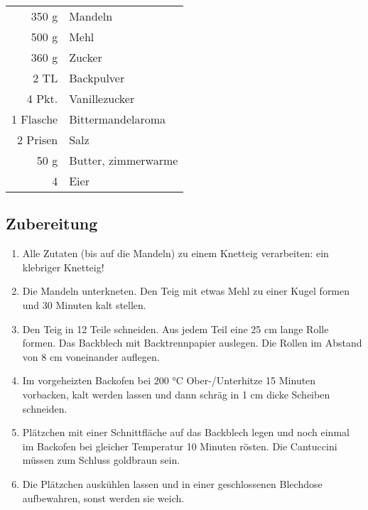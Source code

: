 \begin {tabular}{r l}
    350 g & Mandeln \\
    500 g & Mehl \\
    360 g & Zucker \\
    2 TL & Backpulver \\
    4 Pkt. & Vanillezucker \\
    1 Flasche & Bittermandelaroma \\
    2 Prisen & Salz \\
    50 g & Butter, zimmerwarme \\
    4 & Eier
\end{tabular}
\subsection*{Zubereitung}
\begin{enumerate}
    \item  Alle Zutaten (bis auf die Mandeln) zu einem Knetteig verarbeiten: ein klebriger Knetteig!
    \item  Die Mandeln unterkneten. Den Teig mit etwas Mehl zu einer Kugel formen und 30 Minuten kalt stellen.
    \item  Den Teig in 12 Teile schneiden. Aus jedem Teil eine 25 cm lange Rolle formen. Das Backblech mit Backtrennpapier auslegen. Die Rollen im
    Abstand von 8 cm voneinander auflegen.
    \item  Im vorgeheizten Backofen bei 200 °C Ober-/Unterhitze 15 Minuten vorbacken, kalt werden lassen und dann schräg in 1 cm dicke
    Scheiben schneiden.
    \item  Plätzchen mit einer Schnittfläche auf das Backblech legen und noch einmal im Backofen bei gleicher Temperatur 10 Minuten rösten. Die Cantuccini müssen zum Schluss
    goldbraun sein.
    \item  Die Plätzchen auskühlen lassen und in einer geschlossenen Blechdose aufbewahren, sonst werden sie weich. 
\end{enumerate}
